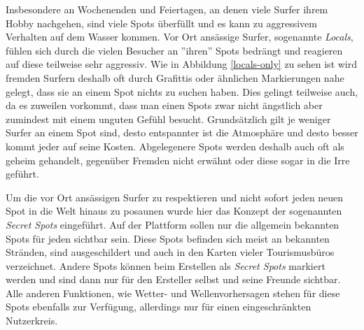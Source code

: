 Insbesondere an Wochenenden und Feiertagen, an denen viele Surfer
ihrem Hobby nachgehen, sind viele Spots überfüllt und es kann zu
aggressivem Verhalten auf dem Wasser kommen. Vor Ort ansässige Surfer,
sogenannte \textit{Locals}, fühlen sich durch die vielen Besucher an
''ihren'' Spots bedrängt und reagieren auf diese teilweise sehr
aggressiv. Wie in Abbildung \ref{locals-only} zu sehen ist wird
fremden Surfern deshalb oft durch Grafittis oder ähnlichen
Markierungen nahe gelegt, dass sie an einem Spot nichts zu suchen
haben. Dies gelingt teilweise auch, da es zuweilen vorkommt, dass man
einen Spots zwar nicht ängstlich aber zumindest mit einem unguten
Gefühl besucht. Grundsätzlich gilt je weniger Surfer an einem Spot
sind, desto entspannter ist die Atmosphäre und desto besser kommt
jeder auf seine Kosten. Abgelegenere Spots werden deshalb auch oft als
geheim gehandelt, gegenüber Fremden nicht erwähnt oder diese sogar in
die Irre geführt.

Um die vor Ort ansässigen Surfer zu respektieren und nicht sofort
jeden neuen Spot in die Welt hinaus zu posaunen wurde hier das Konzept
der sogenannten \textit{Secret Spots} eingeführt. Auf der Plattform
sollen nur die allgemein bekannten Spots für jeden sichtbar
sein. Diese Spots befinden sich meist an bekannten Stränden, sind
ausgeschildert und auch in den Karten vieler Tourismusbüros
verzeichnet. Andere Spots können beim Erstellen als \textit{Secret
  Spots} markiert werden und sind dann nur für den Ersteller selbst
und seine Freunde sichtbar. Alle anderen Funktionen, wie Wetter- und
Wellenvorhersagen stehen für diese Spots ebenfalls zur Verfügung,
allerdings nur für einen eingeschränkten Nutzerkreis.

